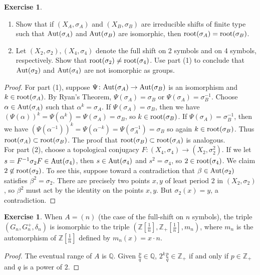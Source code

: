 \documentclass{amsart}
\newcommand{\si}{\index}
\theoremstyle{definition}
\newtheorem{exer}[equation]{Exercise}
\theoremstyle{definition}
\newcommand{\aut}{\textnormal{Aut}}
\numberwithin{equation}{subsection}
\begin{document}
\begin{exer}\label{appexer:ryanthmdist}
\begin{enumerate}
\item
Show that if $(X_{A},\sigma_{A})$ and $(X_{B},\sigma_{B})$ are irreducible shifts of finite type such that $\aut(\sigma_{A})$ and $\aut(\sigma_{B})$ are isomorphic, then $\textnormal{root}(\sigma_{A}) = \textnormal{root}(\sigma_{B})$.
\item
Let $(X_{2},\sigma_{2}), (X_{4},\sigma_{4})$ denote the full shift on 2 symbols and on 4 symbols, respectively. Show that $\textnormal{root}(\sigma_{2}) \ne \textnormal{root}(\sigma_{4})$. Use part (1) to conclude that $\aut(\sigma_{2})$ and $\aut(\sigma_{4})$ are not isomorphic as groups.
\end{enumerate}
\end{exer}
\begin{proof}
  For part (1), suppose $\Psi \colon \aut(\sigma_{A}) \to \aut(\sigma_{B})$ is an isomorphism and $k \in \textnormal{root}(\sigma_{A})$. By Ryan's Theorem\si{Ryan's Theorem}, $\Psi(\sigma_{A}) = \sigma_{B}$ or $\Psi(\sigma_{A})=\sigma_{B}^{-1}$. Choose $\alpha \in \aut(\sigma_{A})$ such that $\alpha^{k} = \sigma_{A}$. If $\Psi(\sigma_{A}) = \sigma_{B}$, then we have
  $(\Psi(\alpha))^{k} = \Psi(\alpha^{k}) = \Psi(\sigma_{A}) = \sigma_{B}$, so $k \in \textnormal{root}(\sigma_{B})$. If $\Psi(\sigma_{A}) = \sigma_{B}^{-1}$, then we have $(\Psi(\alpha^{-1}))^{k} = \Psi(\alpha^{-k}) = \Psi(\sigma_{A}^{-1}) = \sigma_{B}$ so again $k \in \textnormal{root}(\sigma_{B})$. Thus $\textnormal{root}(\sigma_{A}) \subset \textnormal{root}(\sigma_{B})$. The proof that $\textnormal{root}(\sigma_{B}) \subset \textnormal{root}(\sigma_{A})$ is analogous.\\
\indent For part (2), choose a topological conjugacy $F \colon (X_{4},\sigma_{4}) \to (X_{2},\sigma_{2}^{2})$. If we let $s = F^{-1}\sigma_{2}F \in \aut(\sigma_{4})$, then $s \in \aut(\sigma_{4})$ and $s^{2} = \sigma_{4}$, so $2 \in \textnormal{root}(\sigma_{4})$. We claim $2 \not \in \textnormal{root}(\sigma_{2})$. To see this, suppose toward a contradiction that $\beta \in \aut(\sigma_{2})$ satisfies $\beta^{2} = \sigma_{2}$. There are precisely two points $x,y$ of least period 2 in $(X_{2},\sigma_{2})$, so $\beta^{2}$ must act by the identity on the points $x,y$. But $\sigma_{2}(x)=y$, a contradiction.
\end{proof}

\begin{exer}\label{appexer:dimgroupfullshiftcomp}
When $A = (n)$ (the case of the full-shift on $n$ symbols), the triple $(G_{n},G_{n}^{+},\delta_{n})$ is isomorphic to the triple $(\mathbb{Z}[\frac{1}{n}],\mathbb{Z}_{+}[\frac{1}{n}],m_{n})$, where $m_{n}$ is the automorphism of $\mathbb{Z}[\frac{1}{n}]$ defined by $m_{n}(x) = x \cdot n$.
\end{exer}
\begin{proof}
The eventual range of $A$ is $\mathbb{Q}$. Given $\frac{p}{q} \in \mathbb{Q}$, $2^{k}\frac{p}{q} \in \mathbb{Z}_{+}$ if and only if $p \in \mathbb{Z}_{+}$ and $q$ is a power of $2$.
\end{proof}
\end{document}
